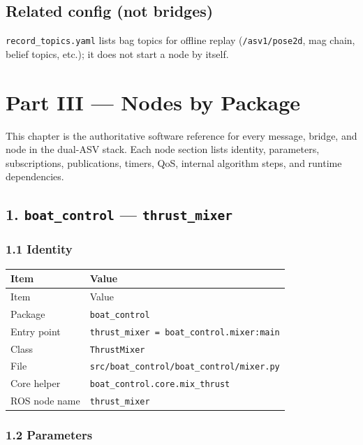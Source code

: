 \section{Related config (not bridges)}


\texttt{record\_topics.yaml} lists bag topics for offline replay (\texttt{/asv1/pose2d}, mag chain, belief topics, etc.); it does not start a node by itself.




\chapter{Part III --- Nodes by Package}
\label{ch:ros-catalog}

This chapter is the authoritative software reference for every message, bridge, and node in the dual-ASV stack. Each node section lists identity, parameters, subscriptions, publications, timers, QoS, internal algorithm steps, and runtime dependencies.




\section{1. \texttt{boat\_control} --- \texttt{thrust\_mixer}}


\subsection{1.1 Identity}


\begin{center}
\small
\begin{longtable}{@{}lp{10cm}@{}}
\toprule
Item & Value \\
\midrule
\endfirsthead
\toprule
Item & Value \\
\midrule
\endhead
Package & \texttt{boat\_control} \\
Entry point & \texttt{thrust\_mixer = boat\_control.mixer:main} \\
Class & \texttt{ThrustMixer} \\
File & \texttt{src/boat\_control/boat\_control/mixer.py} \\
Core helper & \texttt{boat\_control.core.mix\_thrust} \\
ROS node name & \texttt{thrust\_mixer} \\
\bottomrule
\end{longtable}
\end{center}


\subsection{1.2 Parameters}


